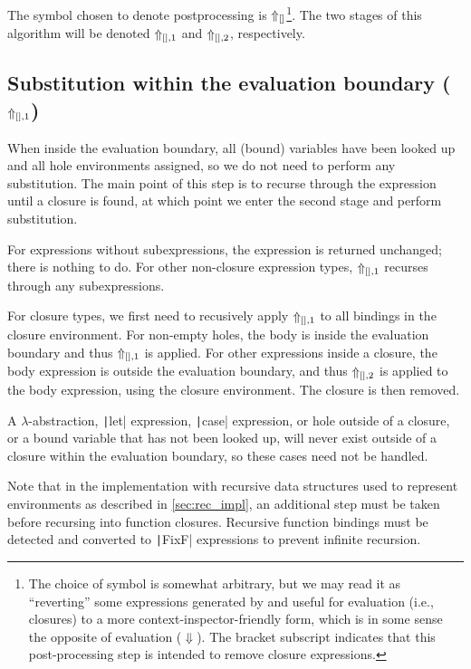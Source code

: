 The symbol chosen to denote postprocessing is $\Uparrow_{[]}$\footnote{The choice of symbol is somewhat arbitrary, but we may read it as ``reverting'' some expressions generated by and useful for evaluation (i.e., closures) to a more context-inspector-friendly form, which is in some sense the opposite of evaluation ($\Downarrow$). The bracket subscript indicates that this post-processing step is intended to remove closure expressions.}. The two stages of this algorithm will be denoted $\Uparrow_{[],1}$ and $\Uparrow_{[],2}$, respectively.

\subsection{Substitution within the evaluation boundary ($\Uparrow_{[],1}$)}
\label{sec:postprocessing-subst-inside}

When inside the evaluation boundary, all (bound) variables have been looked up and all hole environments assigned, so we do not need to perform any substitution. The main point of this step is to recurse through the expression until a closure is found, at which point we enter the second stage and perform substitution.

For expressions without subexpressions, the expression is returned unchanged; there is nothing to do. For other non-closure expression types, $\Uparrow_{[],1}$ recurses through any subexpressions.

For closure types, we first need to recusively apply $\Uparrow_{[],1}$ to all bindings in the closure environment. For non-empty holes, the body is inside the evaluation boundary and thus $\Uparrow_{[],1}$ is applied. For other expressions inside a closure, the body expression is outside the evaluation boundary, and thus $\Uparrow_{[],2}$ is applied to the body expression, using the closure environment. The closure is then removed.

A $\lambda$-abstraction, \texttt|let| expression, \texttt|case| expression, or hole outside of a closure, or a bound variable that has not been looked up, will never exist outside of a closure within the evaluation boundary, so these cases need not be handled.

Note that in the implementation with recursive data structures used to represent environments as described in \cref{sec:rec_impl}, an additional step must be taken before recursing into function closures. Recursive function bindings must be detected and converted to \texttt|FixF| expressions to prevent infinite recursion.


